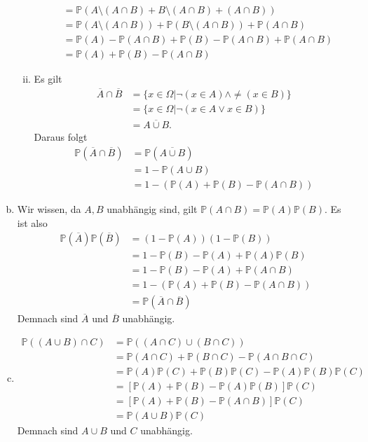 \documentclass{article}
\renewcommand{\P}{\mathbb{P}}
\begin{document}
\begin{enumerate}[a)]
\begin{enumerate}[(i)]
\begin{align*}
                        &=\P(A\setminus(A\cap B)+B\setminus(A\cap B)+(A\cap B))\\
                        &=\P(A\setminus(A\cap B))+\P(B\setminus(A\cap B))+\P(A\cap B)\\
                        &=\P(A)-\P(A\cap B)+\P(B)-\P(A\cap B)+\P(A\cap B)\\
                        &=\P(A)+\P(B)-\P(A\cap B)
                    \end{align*}
                \item
                    Es gilt
                    \begin{align*}
                        \overline{A}\cap\overline{B}
                        &=\{x\in\Omega|\neg(x\in A)\land\neq(x\in B)\}\\
                        &=\{x\in\Omega|\neg(x\in A\lor x\in B)\}\\
                        &=\overline{A\cup B}.
                    \end{align*}
                    Daraus folgt
                    \begin{align*}
                        \P(\overline{A}\cap\overline{B})
                        &=\P(\overline{A\cup B})\\
                        &=1-\P(A\cup B)\\
                        &=1-(\P(A)+\P(B)-\P(A\cap B))
                    \end{align*}
            \end{enumerate}
        \item
            Wir wissen, da $A,B$ unabhängig sind, gilt $\P(A\cap B)=\P(A)\P(B)$.
            Es ist also
            \begin{align*}
                \P(\overline{A})\P(\overline{B})
                &=(1-\P(A))(1-\P(B))\\
                &=1-\P(B)-\P(A)+\P(A)\P(B)\\
                &=1-\P(B)-\P(A)+\P(A\cap B)\\
                &=1-(\P(A)+\P(B)-\P(A\cap B))\\
                &=\P(\overline{A}\cap\overline{B})
            \end{align*}
            Demnach sind $\overline{A}$ und $\overline{B}$ unabhängig.
        \item
            \begin{align*}
                \P((A\cup B)\cap C)
                &=\P((A\cap C)\cup (B\cap C))\\
                &=\P(A\cap C)+\P(B\cap C)-\P(A\cap B\cap C)\\
                &=\P(A)\P(C)+\P(B)\P(C)-\P(A)\P(B)\P(C)\\
                &=[\P(A)+\P(B)-\P(A)\P(B)]\P(C)\\
                &=[\P(A)+\P(B)-\P(A\cap B)]\P(C)\\
                &=\P(A\cup B)\P(C)
            \end{align*}
            Demnach sind $A\cup B$ und $C$ unabhängig.
    \end{enumerate}
\end{document}
